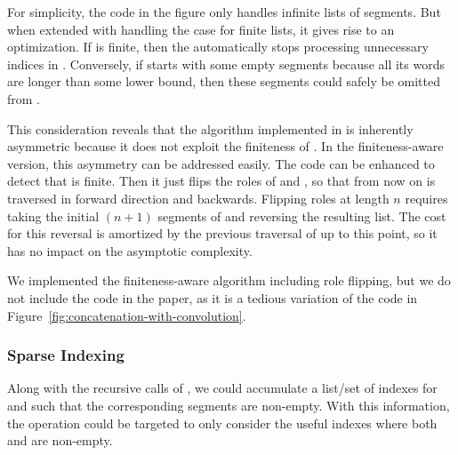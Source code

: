 For simplicity, the code in the figure only handles infinite lists of
segments. But when extended with handling the case for finite lists,
it gives rise to an optimization. If  is finite,
then the  automatically stops processing unnecessary indices in
. Conversely, if  starts with some empty segments
because all its words are longer than some lower bound, then these
segments could safely be omitted from .

This consideration reveals that the algorithm implemented in
 is inherently asymmetric because it does not
exploit the finiteness of . In the finiteness-aware version, this asymmetry can be
addressed easily.  The code can be
enhanced to detect that  is finite. Then it just flips the roles of
 and , so that from now on  is traversed in 
forward direction and  backwards. Flipping roles at length $n$ requires taking
the initial $(n+1)$ segments of  and reversing the resulting
list. The cost for this reversal is amortized by the previous traversal of
 up to this point, so it has no impact on the asymptotic
complexity.

We implemented the finiteness-aware algorithm including role flipping,
but we do not include the code in the paper, as it is a
tedious variation of the code in
Figure~\ref{fig:concatenation-with-convolution}. 


\subsubsection{Sparse Indexing}\label{sec:sparse-indexing}
Along with the recursive calls of , we could accumulate
a list/set of indexes for  and  such that the
corresponding segments are non-empty. With this information, the
 operation could be targeted to only consider the useful
indexes where both  and  are
non-empty.

